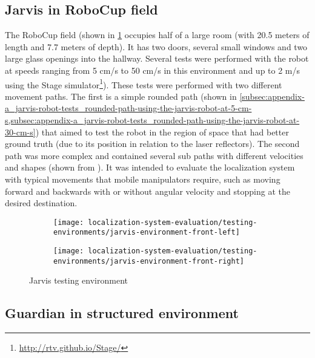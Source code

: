 \subsection{Jarvis in RoboCup field}

The RoboCup field (shown in \cref{fig:localization-system-evaluation_jarvis-tests-environment} occupies half of a large room (with 20.5 meters of length and 7.7 meters of depth). It has two doors, several small windows and two large glass openings into the hallway. Several tests were performed with the robot at speeds ranging from 5 cm/s to 50 cm/s in this environment and up to 2 m/s using the Stage simulator\footnote{\url{http://rtv.github.io/Stage/}}). These tests were performed with two different movement paths. The first is a simple rounded path (shown in \cref{subsec:appendix-a_jarvis-robot-tests_rounded-path-using-the-jarvis-robot-at-5-cm-s,subsec:appendix-a_jarvis-robot-tests_rounded-path-using-the-jarvis-robot-at-30-cm-s}) that aimed to test the robot in the region of space that had better ground truth (due to its position in relation to the laser reflectors). The second path was more complex and contained several sub paths with different velocities and shapes (shown from ). It was intended to evaluate the localization system with typical movements that mobile manipulators require, such as moving forward and backwards with or without angular velocity and stopping at the desired destination.


\begin{figure}[H]
	\centering
	\begin{subfigure}[h]{.497\textwidth}
		\centering
		\texttt{[image: localization-system-evaluation/testing-environments/jarvis-environment-front-left]}
	\end{subfigure}
	\begin{subfigure}[h]{.497\textwidth}
		\centering
		\texttt{[image: localization-system-evaluation/testing-environments/jarvis-environment-front-right]}
	\end{subfigure}
	\caption{Jarvis testing environment}
	\label{fig:localization-system-evaluation_jarvis-tests-environment}
\end{figure}


\subsection{Guardian in structured environment}


